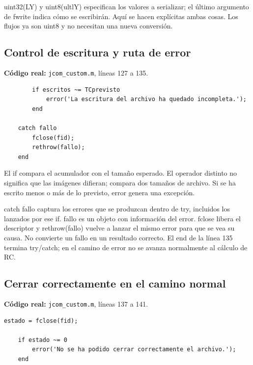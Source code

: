 \documentclass[11pt,a4paper,oneside]{report}
\begin{document}
uint32(LY) y uint8(ultlY) especifican los valores a serializar; el último
argumento de fwrite indica cómo se escribirán. Aquí se hacen explícitas ambas
cosas. Los flujos ya son uint8 y no necesitan una nueva conversión.


\par\medskip\noindent\begin{minipage}{\linewidth}

\subsection{Control de escritura y ruta de error}

\textbf{Código real:} \texttt{jcom\_custom.m}, líneas 127 a 135.

\begin{lstlisting}[firstnumber=127]
        % Comprobar que se han escrito todos los bytes.
        if escritos ~= TCprevisto
            error('La escritura del archivo ha quedado incompleta.');
        end

    catch fallo
        fclose(fid);
        rethrow(fallo);
    end
\end{lstlisting}

\end{minipage}\par


El if compara el acumulador con el tamaño esperado. El operador distinto
no significa que las imágenes difieran; compara dos tamaños de archivo.
Si se ha escrito menos o más de lo previsto, error genera una excepción.

catch fallo captura los errores que se produzcan dentro de try, incluidos
los lanzados por ese if. fallo es un objeto con información del error.
fclose libera el descriptor y rethrow(fallo) vuelve a lanzar el mismo error
para que se vea su causa. No convierte un fallo en un resultado correcto.
El end de la línea 135 termina try/catch; en el camino de error no se avanza
normalmente al cálculo de RC.


\par\medskip\noindent\begin{minipage}{\linewidth}

\subsection{Cerrar correctamente en el camino normal}

\textbf{Código real:} \texttt{jcom\_custom.m}, líneas 137 a 141.

\begin{lstlisting}[firstnumber=137]
    estado = fclose(fid);

    if estado ~= 0
        error('No se ha podido cerrar correctamente el archivo.');
    end
\end{lstlisting}

\end{minipage}\par
\end{document}
